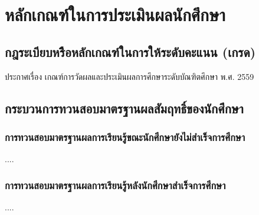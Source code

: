 \chapter{หลักเกณฑ์ในการประเมินผลนักศึกษา}

\section{กฎระเบียบหรืิอหลักเกณฑ์ในการให้ระดับคะแนน (เกรด)}

ประกาศ\univerity เรื่อง เกณฑ์การวัดผลและประเมินผลการศึกษาระดับบัณฑิตศึกษา พ.ศ. 2559

\section{กระบวนการทวนสอบมาตรฐานผลสัมฤทธิ์ของนักศึกษา}

\subsection{การทวนสอบมาตรฐานผลการเรียนรู้ขณะนักศึกษายังไม่สำเร็จการศึกษา}

....

\subsection{การทวนสอบมาตรฐานผลการเรียนรู้หลังนักศึกษาสำเร็จการศึกษา}

....

